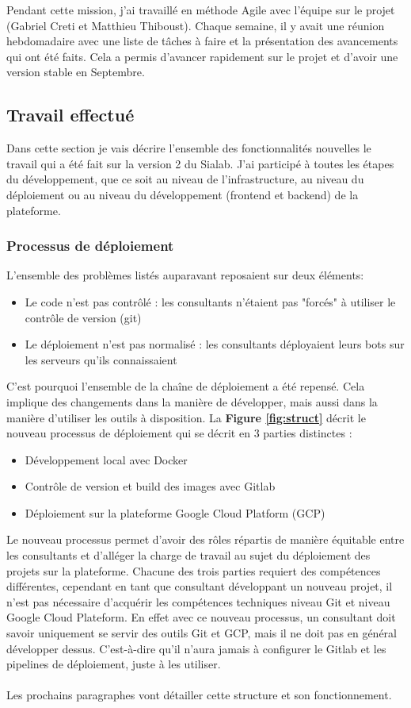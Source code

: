 \documentclass{article} %
\begin{document}
{Pendant cette mission, j'ai travaillé en méthode Agile avec l'équipe sur le projet (Gabriel Creti et Matthieu Thiboust). Chaque semaine, il y avait une réunion hebdomadaire avec une liste de tâches à faire et la présentation des avancements qui ont été faits. Cela a permis d'avancer rapidement sur le projet et d'avoir une version stable en Septembre.

\subsection{Travail effectué}
Dans cette section je vais décrire l'ensemble des fonctionnalités nouvelles le travail qui a été fait sur la version 2 du Sialab. J'ai participé à toutes les étapes du développement, que ce soit au niveau de l'infrastructure, au niveau du déploiement ou au niveau du développement (frontend et backend) de la plateforme.

\subsubsection{Processus de déploiement}

L'ensemble des problèmes listés auparavant reposaient sur deux éléments:
\begin{itemize}
 \item Le code n'est pas contrôlé : les consultants n'étaient pas "forcés" à utiliser le contrôle de version (git)
 \item Le déploiement n'est pas normalisé : les consultants déployaient leurs bots sur les serveurs qu'ils connaissaient
\end{itemize}
C'est pourquoi l'ensemble de la chaîne de déploiement a été repensé. Cela implique des changements dans la manière de développer, mais aussi dans la manière d'utiliser les outils à disposition. La \textbf{Figure \ref{fig:struct}} décrit le nouveau processus de déploiement qui se décrit en 3 parties distinctes :
\begin{itemize}
 \item Développement local avec Docker
 \item Contrôle de version et build des images avec Gitlab
 \item Déploiement sur la plateforme Google Cloud Platform (GCP)
\end{itemize}
Le nouveau processus permet d'avoir des rôles répartis de manière équitable entre les consultants et d'alléger la charge de travail au sujet du déploiement des projets sur la plateforme. Chacune des trois parties requiert des compétences différentes, cependant en tant que consultant développant un nouveau projet, il n'est pas nécessaire d'acquérir les compétences techniques niveau Git et niveau Google Cloud Plateform. En effet avec ce nouveau processus, un consultant doit savoir uniquement se servir des outils Git et GCP, mais il ne doit pas en général développer dessus. C'est-à-dire qu'il n'aura jamais à configurer le Gitlab et les pipelines de déploiement, juste à les utiliser.\\ \\
Les prochains paragraphes vont détailler cette structure et son fonctionnement.
\newpage

}
\end{document}
